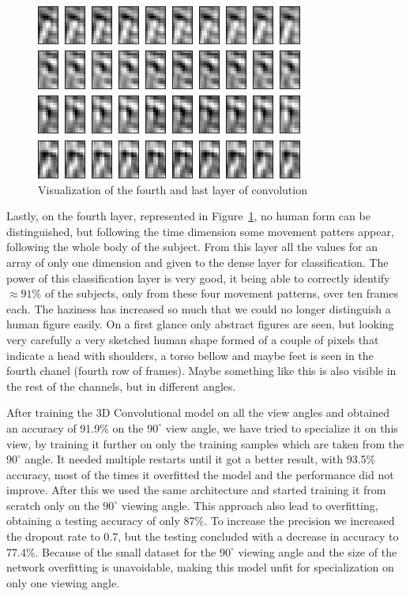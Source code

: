 \documentclass[12pt]{article}
\theoremstyle{definition}
\begin{document}
	\begin{figure}[ht]
		\includegraphics[width=\textwidth]{conv-see/visualization-16.jpg}
		\caption{Visualization of the fourth and last layer of convolution}
		\label{figure:visualize-conv-4}
	\end{figure}

	Lastly, on the fourth layer, represented in Figure~\ref{figure:visualize-conv-4}, no human form can be distinguished, but following the time dimension some movement patters appear, following the whole body of the subject. From this layer all the values for an array of only one dimension and given to the dense layer for classification. The power of this classification layer is very good, it being able to correctly identify $\approx 91\%$ of the subjects, only from these four movement patterns, over ten frames each. The haziness has increased so much that we could no longer distinguish a human figure easily. On a first glance only abstract figures are seen, but looking very carefully a very sketched human shape formed of a couple of pixels that indicate a head with shoulders, a torso bellow and maybe feet is seen in the fourth chanel (fourth row of frames). Maybe something like this is also visible in the rest of the channels, but in different angles.

	After training the 3D Convolutional model on all the view angles and obtained an accuracy of 91.9\% on the $90^\circ$ view angle, we have tried to specialize it on this view, by training it further on only the training samples which are taken from the $90^\circ$ angle. It needed multiple restarts until it got a better result, with 93.5\% accuracy, most of the times it overfitted the model and the performance did not improve. After this we used the same architecture and started training it from scratch only on the $90^\circ$ viewing angle. This approach also lead to overfitting, obtaining a testing accuracy of only 87\%. To increase the precision we increased the dropout rate to 0.7, but the testing concluded with a decrease in accuracy to 77.4\%. Because of the small dataset for the $90^\circ$ viewing angle and the size of the network overfitting is unavoidable, making this model unfit for specialization on only one viewing angle.
\end{document}
